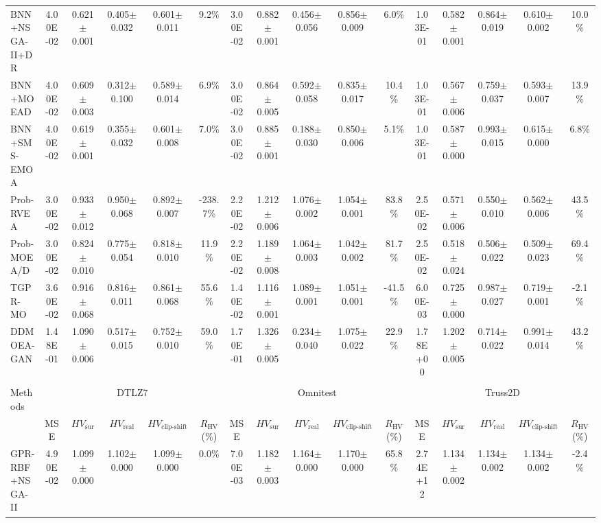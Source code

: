 \begin{table}[htbp]
{\begin{tabular}{l c c c c c c c c c c c c c c c}
BNN+NSGA-II+DR & 4.00E-02 & 0.621$\pm$0.001 & 0.405$\pm$0.032 & 0.601$\pm$0.011 & 9.2\% & 3.00E-02 & 0.882$\pm$0.001 & 0.456$\pm$0.056 & 0.856$\pm$0.009 & 6.0\% & 1.03E-01 & 0.582$\pm$0.001 & 0.864$\pm$0.019 & 0.610$\pm$0.002 & 10.0\% \\
BNN+MOEAD & 4.00E-02 & 0.609$\pm$0.003 & 0.312$\pm$0.100 & 0.589$\pm$0.014 & 6.9\% & 3.00E-02 & 0.864$\pm$0.005 & 0.592$\pm$0.058 & 0.835$\pm$0.017 & 10.4\% & 1.03E-01 & 0.567$\pm$0.006 & 0.759$\pm$0.037 & 0.593$\pm$0.007 & 13.9\% \\
BNN+SMS-EMOA & 4.00E-02 & 0.619$\pm$0.001 & 0.355$\pm$0.032 & 0.601$\pm$0.008 & 7.0\% & 3.00E-02 & 0.885$\pm$0.001 & 0.188$\pm$0.030 & 0.850$\pm$0.006 & 5.1\% & 1.03E-01 & 0.587$\pm$0.000 & 0.993$\pm$0.015 & 0.615$\pm$0.000 & 6.8\% \\
Prob-RVEA & 3.00E-02 & 0.933$\pm$0.012 & 0.950$\pm$0.068 & 0.892$\pm$0.007 & -238.7\% & 2.20E-02 & 1.212$\pm$0.006 & 1.076$\pm$0.002 & 1.054$\pm$0.001 & 83.8\% & 2.50E-02 & 0.571$\pm$0.006 & 0.550$\pm$0.010 & 0.562$\pm$0.006 & 43.5\% \\
Prob-MOEA/D & 3.00E-02 & 0.824$\pm$0.010 & 0.775$\pm$0.054 & 0.818$\pm$0.010 & 11.9\% & 2.20E-02 & 1.189$\pm$0.008 & 1.064$\pm$0.003 & 1.042$\pm$0.002 & 81.7\% & 2.50E-02 & 0.518$\pm$0.024 & 0.506$\pm$0.022 & 0.509$\pm$0.023 & 69.4\% \\
TGPR-MO & 3.60E-02 & 0.916$\pm$0.068 & 0.816$\pm$0.011 & 0.861$\pm$0.068 & 55.6\% & 1.40E-02 & 1.116$\pm$0.001 & 1.089$\pm$0.001 & 1.051$\pm$0.001 & -41.5\% & 6.00E-03 & 0.725$\pm$0.000 & 0.987$\pm$0.027 & 0.719$\pm$0.001 & -2.1\% \\
DDMOEA-GAN & 1.48E-01 & 1.090$\pm$0.006 & 0.517$\pm$0.015 & 0.752$\pm$0.010 & 59.0\% & 1.70E-01 & 1.326$\pm$0.005 & 0.234$\pm$0.040 & 1.075$\pm$0.022 & 22.9\% & 1.78E+00 & 1.202$\pm$0.005 & 0.714$\pm$0.022 & 0.991$\pm$0.014 & 43.2\% \\
\hline
\multicolumn{16}{c}{} \\
\hline
Methods & \multicolumn{5}{c}{DTLZ7} & \multicolumn{5}{c}{Omnitest} & \multicolumn{5}{c}{Truss2D} \\
\cmidrule(lr){2-6} \cmidrule(lr){7-11} \cmidrule(lr){12-16}
 & MSE & $HV_{\mathrm{sur}}$ & $HV_{\mathrm{real}}$ & $HV_{\mathrm{clip\text{-}shift}}$ & $R_{\mathrm{HV}}$ (\%) & MSE & $HV_{\mathrm{sur}}$ & $HV_{\mathrm{real}}$ & $HV_{\mathrm{clip\text{-}shift}}$ & $R_{\mathrm{HV}}$ (\%) & MSE & $HV_{\mathrm{sur}}$ & $HV_{\mathrm{real}}$ & $HV_{\mathrm{clip\text{-}shift}}$ & $R_{\mathrm{HV}}$ (\%) \\
\hline
GPR-RBF+NSGA-II & 4.90E-02 & 1.099$\pm$0.000 & 1.102$\pm$0.000 & 1.099$\pm$0.000 & 0.0\% & 7.00E-03 & 1.182$\pm$0.003 & 1.164$\pm$0.000 & 1.170$\pm$0.000 & 65.8\% & 2.74E+12 & 1.134$\pm$0.002 & 1.134$\pm$0.002 & 1.134$\pm$0.002 & -2.4\% \\

\end{tabular}}
\end{table}
